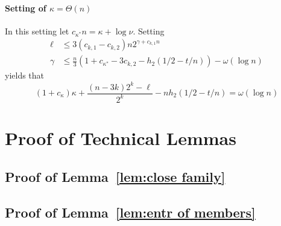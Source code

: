 \paragraph{Setting of $\kappa = \Theta(n)$}
In this setting let $c_{\kappa^*} n = \kappa+\log{\nu}$.  Setting 
\begin{align*}
\ell&\le  3(c_{k,1}-c_{k,2})n2^{\gamma+c_{k,1}n}\\
\gamma&\le \frac{n}{3}\left(1+c_{\kappa^*} -3c_{k,2}-h_2(1/2-t/n)\right) - \omega(\log{n})
\end{align*}
yields that \[ (1+c_{\kappa})\kappa+\frac{(n-3k)2^k-\ell}{2^k} - nh_2(1/2-t/n) = \omega(\log n)\] 

\section{Proof of Technical Lemmas}
\subsection{Proof of Lemma~\ref{lem:close family}}



\subsection{Proof of Lemma~\ref{lem:entr of members}}

